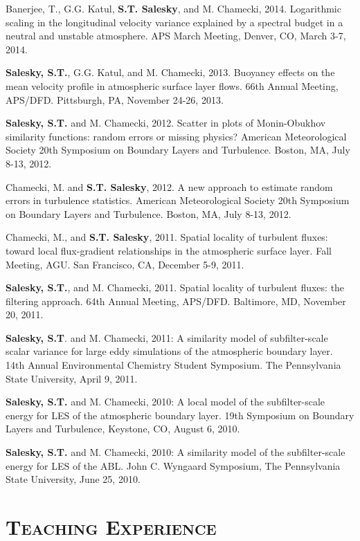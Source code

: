 \documentclass[11pt,letterpaper]{article}
\begin{document}
Banerjee, T., G.G. Katul, \textbf{S.T. Salesky}, and M. Chamecki, 2014.
Logarithmic scaling in the longitudinal velocity variance explained by a
spectral budget in a neutral and unstable atmosphere. APS March Meeting,
Denver, CO, March 3-7, 2014. 

\textbf{Salesky, S.T.}, G.G. Katul, and M. Chamecki, 2013. Buoyancy effects on
the mean velocity profile in atmospheric surface layer flows. 66th Annual
Meeting, APS/DFD. Pittsburgh, PA, November 24-26, 2013. 

\textbf{Salesky, S.T.} and M. Chamecki, 2012. Scatter in plots of Monin-Obukhov
similarity functions: random errors or missing physics? American Meteorological
Society 20th Symposium on Boundary Layers and Turbulence. Boston, MA, July
8-13, 2012. 

Chamecki, M. and \textbf{S.T. Salesky}, 2012. A new approach to estimate random
errors in turbulence statistics. American Meteorological Society 20th Symposium
on Boundary Layers and Turbulence. Boston, MA, July 8-13, 2012. 

Chamecki, M., and \textbf{S.T. Salesky}, 2011. Spatial locality of turbulent
fluxes: toward local flux-gradient relationships in the atmospheric surface
layer. Fall Meeting, AGU. San Francisco, CA, December 5-9, 2011. 

\textbf{Salesky, S.T.}, and M. Chamecki, 2011. Spatial locality of turbulent
fluxes: the filtering approach. 64th Annual Meeting, APS/DFD. Baltimore, MD,
November 20, 2011. 

\textbf{Salesky, S.T}. and M. Chamecki, 2011: A similarity model of
subfilter-scale scalar variance for large eddy simulations of the atmospheric
boundary layer. 14th Annual Environmental Chemistry Student Symposium. The
Pennsylvania State University, April 9, 2011. 

\textbf{Salesky, S.T.} and M. Chamecki, 2010: A local model of the
subfilter-scale energy for LES of the atmospheric boundary layer. 19th
Symposium on Boundary Layers and Turbulence, Keystone, CO, August 6, 2010. 

\textbf{Salesky, S.T.} and M. Chamecki, 2010: A similarity model of the
subfilter-scale energy for LES of the ABL. John C. Wyngaard Symposium, The
Pennsylvania State University, June 25, 2010. 

\section*{\textsc{Teaching Experience}} 
\end{document}
